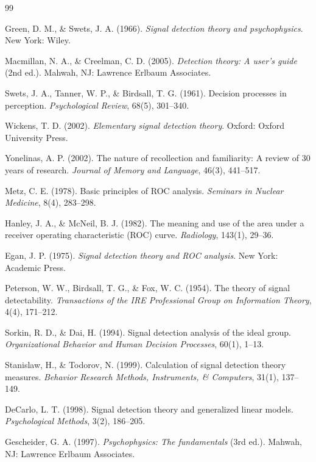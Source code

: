 \documentclass[11pt,a4paper]{article}
\begin{document}
\begin{thebibliography}{99}

Green, D. M., \& Swets, J. A. (1966). \textit{Signal detection theory and psychophysics}. New York: Wiley.

Macmillan, N. A., \& Creelman, C. D. (2005). \textit{Detection theory: A user's guide} (2nd ed.). Mahwah, NJ: Lawrence Erlbaum Associates.

Swets, J. A., Tanner, W. P., \& Birdsall, T. G. (1961). Decision processes in perception. \textit{Psychological Review}, 68(5), 301--340.

Wickens, T. D. (2002). \textit{Elementary signal detection theory}. Oxford: Oxford University Press.

Yonelinas, A. P. (2002). The nature of recollection and familiarity: A review of 30 years of research. \textit{Journal of Memory and Language}, 46(3), 441--517.

Metz, C. E. (1978). Basic principles of ROC analysis. \textit{Seminars in Nuclear Medicine}, 8(4), 283--298.

Hanley, J. A., \& McNeil, B. J. (1982). The meaning and use of the area under a receiver operating characteristic (ROC) curve. \textit{Radiology}, 143(1), 29--36.

Egan, J. P. (1975). \textit{Signal detection theory and ROC analysis}. New York: Academic Press.

Peterson, W. W., Birdsall, T. G., \& Fox, W. C. (1954). The theory of signal detectability. \textit{Transactions of the IRE Professional Group on Information Theory}, 4(4), 171--212.

Sorkin, R. D., \& Dai, H. (1994). Signal detection analysis of the ideal group. \textit{Organizational Behavior and Human Decision Processes}, 60(1), 1--13.

Stanislaw, H., \& Todorov, N. (1999). Calculation of signal detection theory measures. \textit{Behavior Research Methods, Instruments, \& Computers}, 31(1), 137--149.

DeCarlo, L. T. (1998). Signal detection theory and generalized linear models. \textit{Psychological Methods}, 3(2), 186--205.

Gescheider, G. A. (1997). \textit{Psychophysics: The fundamentals} (3rd ed.). Mahwah, NJ: Lawrence Erlbaum Associates.


\end{thebibliography}
\end{document}

